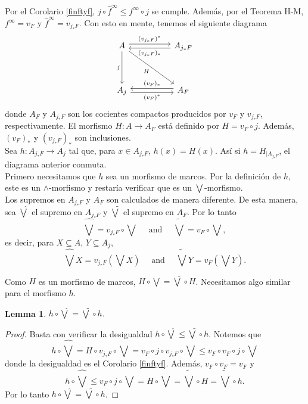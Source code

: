 \documentclass[11pt]{amsart}
\theoremstyle{plain}
\newtheorem{lem}[thm]{Lemma}
\theoremstyle{definition}
\begin{document}
Por el Corolario \ref{finftyf}, $j\circ \hat{f}^\infty\leq f^\infty\circ j$ se cumple. Además, por el Teorema H-M, $f^\infty=v_F$ y $\hat{f}^\infty=v_{j_*F}$. 
Con esto en mente, tenemos el siguiente diagrama
\[\begin{tikzcd}
	A && {A_{j_*F}} \\
	\\
	{A_j} && {A_F}
	\arrow["{(v_{j_*F})^*}", shift left, from=1-1, to=1-3]
	\arrow["j"', from=1-1, to=3-1]
	\arrow["H"', from=1-1, to=3-3]
	\arrow["{(v_{j_*F})_*}", shift left, from=1-3, to=1-1]
	\arrow["{(v_F)^*}"', shift right, from=3-1, to=3-3]
	\arrow["{(v_F)_*}"', shift right, from=3-3, to=3-1]
\end{tikzcd}\]
donde $A_F$ y $A_{j_*F}$ son los cocientes compactos producidos por $v_F$ y $v_{j_*F}$, respectivamente. El morfismo $H\colon A\to A_F$ está definido por $H=v_F\circ j$. Además, $(v_F)_*$ y $(v_{j_*F})_*$ son inclusiones.\\

Sea $h\colon A_{j_*F}\to A_j$ tal que, para $x\in A_{j_*F}$, $h(x)=H(x)$. Así si $h=H_{\mid{A_{j_*F}}}$, el diagrama anterior conmuta.\\

Primero necesitamos que $h$ sea un morfismo de marcos. Por la definición de $h$, este es un $\wedge$-morfismo y restaría verificar que es un $\bigvee$-morfismo.\\

Los supremos en $A_{j_*F}$ y $A_F$ son calculados de manera diferente. De esta manera, sea $\hat{\bigvee}$ el supremo en $A_{j_*F}$ y $\tilde{\bigvee}$ el supremo en $A_F$. Por lo tanto
\[
\hat{\bigvee}=v_{j_*F}\circ \bigvee\quad\mbox{ and }\quad \tilde{\bigvee}=v_{F}\circ \bigvee,
\] 
es decir, para $X\subseteq A$, $Y\subseteq A_j$,
\[
	\hat{\bigvee}X=v_{j_*F}(\bigvee X)\quad\mbox{ and }\quad \tilde{\bigvee}Y=v_{F}(\bigvee Y).
\]

Como $H$ es un morfismo de marcos, $H\circ \bigvee=\tilde{\bigvee}\circ H$. Necesitamos algo similar para el morfismo $h$.

\begin{lem}\label{bigvee g}
$h\circ \hat{\bigvee}=\tilde{\bigvee}\circ h$.
\end{lem}

\begin{proof}
Basta con verificar la desigualdad $h\circ \hat{\bigvee}\leq \tilde{\bigvee}\circ h$. Notemos que
\[
h\circ \hat{\bigvee}=H\circ v_{j_*F}\circ \bigvee=v_F\circ j\circ v_{j_*F}\circ \bigvee\leq v_F\circ v_F\circ j\circ \bigvee
\]
donde la desigualdad es el Corolario \ref{finftyf}. Además, $v_F\circ v_F=v_F$ y
\[
h\circ\hat{\bigvee}\leq v_F\circ j\circ \bigvee =H\circ \bigvee=\tilde{\bigvee}\circ H=\tilde{\bigvee}\circ h.
\]
Por lo tanto $h\circ\hat{\bigvee}=\tilde{\bigvee}\circ h$.
\end{proof}
\end{document}
